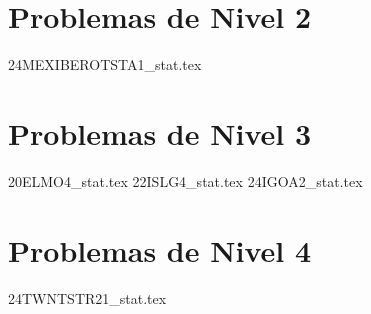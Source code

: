\section{Problemas de Nivel 2}
{24MEXIBEROTSTA1_stat.tex} %

\section{Problemas de Nivel 3}
{20ELMO4_stat.tex} %
{22ISLG4_stat.tex} %
{24IGOA2_stat.tex} %

\section{Problemas de Nivel 4}
{24TWNTSTR21_stat.tex} %